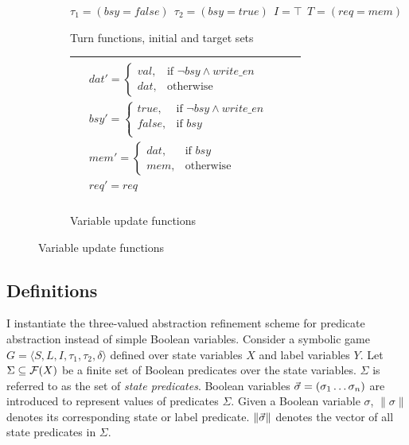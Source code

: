 \begin{figure}
    \centering
    \caption{Game specification}
    \label{fig:ex_game_specification}
    \begin{subfigure}{\linewidth}
    \caption{Turn functions, initial and target sets}
    $\tau_1=(bsy=false)~~\tau_2=(bsy=true)~~I=\top~~T=(req=mem)$
    \end{subfigure}

    \begin{subfigure}{\linewidth}
    \caption{Variable update functions}
    \begin{tabular}{|p{0.9\linewidth}|}
        \hline
        $
        \begin{aligned}
            &dat' = \begin{cases}
                        val, & \text{if } \neg bsy \wedge write\_en \\
                        dat, & \text{otherwise}
                    \end{cases}\\
            &bsy' = \begin{cases} 
                        true,   & \text{if } \neg bsy \wedge write\_en \\
                        false,  & \text{if } bsy \\
                    \end{cases}\\
            &mem' = \begin{cases}
                        dat, & \text{if } bsy \\
                        mem, & \text{otherwise}
                    \end{cases}\\
            &req' = req\\
        \end{aligned}
        $ \\
        \hline
    \end{tabular}
    \end{subfigure}

\end{figure}

\subsection{Definitions}

I instantiate the three-valued abstraction refinement scheme for predicate abstraction instead of simple Boolean variables. Consider a symbolic game $G = \langle S, L, I, \tau_1, \tau_2, \delta \rangle$ defined over state variables $X$ and label variables $Y$. Let $\Sigma\subseteq\mathcal{F}(X)$ be a finite set of Boolean predicates over the state variables. $\Sigma$ is referred to as the set of \emph{state predicates}. Boolean variables $\vec{\sigma}=(\sigma_1\ldots\sigma_n)$ are introduced to represent values of predicates $\Sigma$. Given a Boolean variable $\sigma$, $\|\sigma\|$ denotes its corresponding state or label predicate. $\|\vec{\sigma}\|$ denotes the vector of all state predicates in $\Sigma$.

